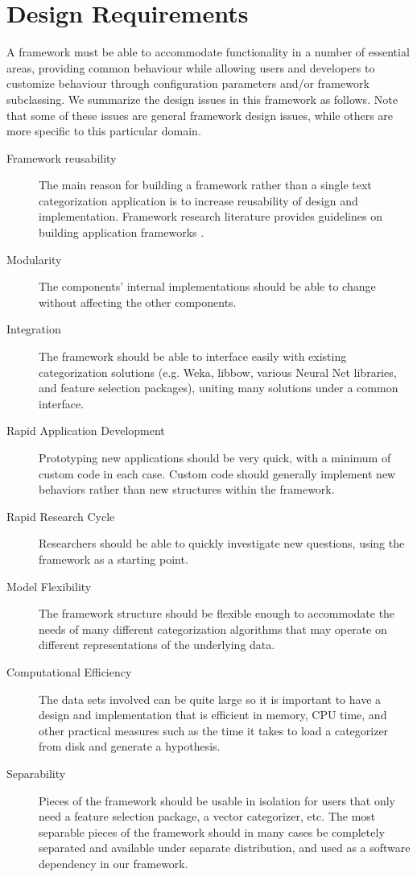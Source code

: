 \documentclass[a4paper,twocolumn]{article}
\begin{document}
\section{Design Requirements}

A framework must be able to accommodate functionality in a number of essential areas, providing common behaviour while allowing users and developers to customize behaviour through configuration parameters and/or framework subclassing.  We summarize the design issues in this framework as follows.  Note that some of these issues are general framework design issues, while others are more specific to this particular domain.

\begin{description}
\item[Framework reusability] The main reason for building a framework rather than a single text categorization application is to increase reusability of design and implementation.  Framework research literature provides guidelines on building application frameworks \cite{fayad:99}.
\item[Modularity] The components' internal implementations should be able to change  without affecting the other components.
\item[Integration] The framework should be able to interface easily with existing categorization solutions (e.g. Weka, libbow, various Neural Net libraries, and feature selection packages), uniting many solutions under a common interface.
\item[Rapid Application Development] Prototyping new applications should be very quick, with a minimum of custom code in each case.  Custom code should generally implement new behaviors rather than new structures within the framework.
\item[Rapid Research Cycle] Researchers should be able to quickly investigate new questions, using the framework as a starting point.
\item[Model Flexibility] The framework structure should be flexible enough to accommodate the needs of many different categorization algorithms that may operate on different representations of the underlying data.
\item[Computational Efficiency] The data sets involved can be quite
large so it is important to have a design and implementation that is
efficient in memory, CPU time, and other practical measures such as
the time it takes to load a categorizer from disk and generate a
hypothesis.
\item[Separability] Pieces of the framework should be usable in isolation for users that only need a feature selection package, a vector categorizer, etc.  The most separable pieces of the framework should in many cases be completely separated and available under separate distribution, and used as a software dependency in our framework.
\end{description}
\end{document}
